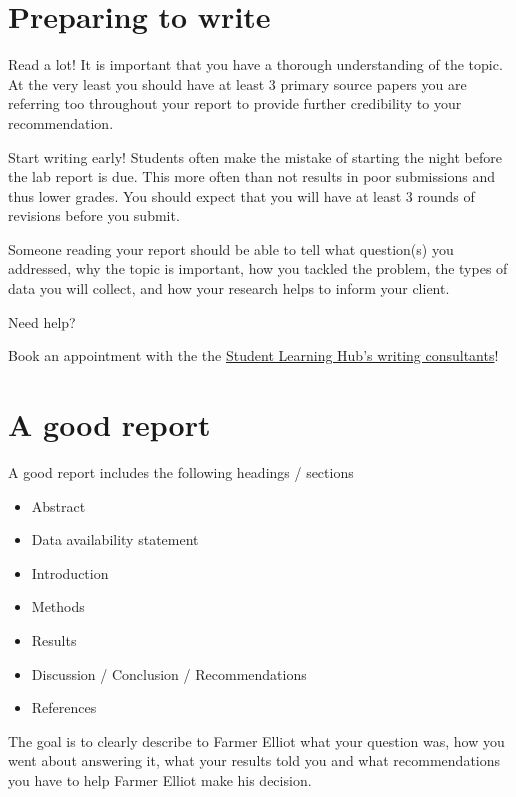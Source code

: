 \documentclass[
]{book}
\providecommand{\tightlist}{%
  \setlength{\itemsep}{0pt}\setlength{\parskip}{0pt}}
\begin{document}
\hypertarget{preparing-to-write}{%
\section*{Preparing to write}\label{preparing-to-write}}

Read a lot! It is important that you have a thorough understanding of the topic. At the very least you should have at least 3 primary source papers you are referring too throughout your report to provide further credibility to your recommendation.

Start writing early! Students often make the mistake of starting the night before the lab report is due. This more often than not results in poor submissions and thus lower grades. You should expect that you will have at least 3 rounds of revisions before you submit.

Someone reading your report should be able to tell what question(s) you addressed, why the topic is important, how you tackled the problem, the types of data you will collect, and how your research helps to inform your client.

Need help?

Book an appointment with the the \href{https://students.ok.ubc.ca/academic-success/learning-hub/writing-language/}{Student Learning Hub's writing consultants}!

\hypertarget{a-good-report}{%
\section*{A good report}\label{a-good-report}}

A good report includes the following headings / sections

\begin{itemize}
\tightlist
\item
  Abstract
\item
  Data availability statement
\item
  Introduction
\item
  Methods
\item
  Results
\item
  Discussion / Conclusion / Recommendations
\item
  References
\end{itemize}

The goal is to clearly describe to Farmer Elliot what your question was, how you went about answering it, what your results told you and what recommendations you have to help Farmer Elliot make his decision.
\end{document}
